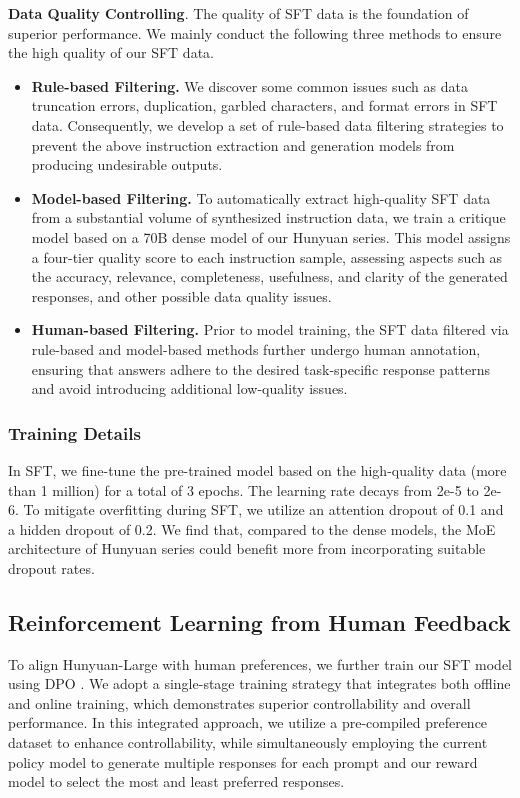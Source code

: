 \documentclass{article}
\begin{document}
\textbf{Data Quality Controlling}.
The quality of SFT data is the foundation of superior performance. We mainly conduct the following three methods to ensure the high quality of our SFT data.

\begin{itemize}[leftmargin=10pt]
    \item \textbf{Rule-based Filtering.}
    We discover some common issues such as data truncation errors, duplication, garbled characters, and format errors in SFT data. Consequently, we develop a set of rule-based data filtering strategies to prevent the above instruction extraction and generation models from producing undesirable outputs.
    \item \textbf{Model-based Filtering.}
    To automatically extract high-quality SFT data from a substantial volume of synthesized instruction data, we train a critique model \citep{mcaleese2024llm} based on a 70B dense model of our Hunyuan series. This model assigns a four-tier quality score to each instruction sample, assessing aspects such as the accuracy, relevance, completeness, usefulness, and clarity of the generated responses, and other possible data quality issues. 
    \item \textbf{Human-based Filtering.}
    Prior to model training, the SFT data filtered via rule-based and model-based methods further undergo human annotation, ensuring that answers adhere to the desired task-specific response patterns and avoid introducing additional low-quality issues.
\end{itemize}

\subsubsection{Training Details}
In SFT, we fine-tune the pre-trained model based on the high-quality data (more than 1 million) for a total of 3 epochs. The learning rate decays from 2e-5 to 2e-6. To mitigate overfitting during SFT, we utilize an attention dropout of 0.1 and a hidden dropout of 0.2. We find that, compared to the dense models, the MoE architecture of Hunyuan series could benefit more from incorporating suitable dropout rates.

\subsection{Reinforcement Learning from Human Feedback}

To align Hunyuan-Large with human preferences, we further train our SFT model using DPO \citep{rafailov2024direct}. We adopt a single-stage training strategy that integrates both offline and online training, which demonstrates superior controllability and overall performance. In this integrated approach, we utilize a pre-compiled preference dataset to enhance controllability, while simultaneously employing the current policy model to generate multiple responses for each prompt and our reward model to select the most and least preferred responses.
\end{document}
